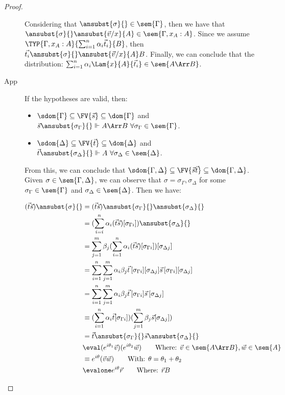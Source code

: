\begin{proof}
\begin{description}
    Considering that $\ansubst{\sigma}{}\in\sem{\Gamma}$, then we have that $\ansubst{\sigma}{}\ansubst{\vec v/x}{A}\in\sem{\Gamma,x_A:A}$. Since we assume $\TYP{\Gamma, x_A:A}{\sum_{i=1}^{n}\alpha_i\vec t_i}{B}$, then $\vec{t_i}\ansubst{\sigma}{}\ansubst{\vec v/x}{A}\real B$. Finally, we can conclude that the distribution: $\sum_{i=1}^{n}\alpha_i \Lam{x}{A}{\vec t_i}\in\sem{A\Arr B}$.

    \item[App] If the hypotheses are valid, then:
    \begin{itemize}
        \item $\sdom{\Gamma}\subseteq \FV{\vec s}\subseteq \dom{\Gamma}$ and $\vec s \ansubst{\sigma_\Gamma}{}\Vdash A\Arr B\ \forall \sigma_\Gamma\in\sem{\Gamma}$.
        \item $\sdom{\Delta}\subseteq \FV{\vec t}\subseteq \dom{\Delta}$ and $\vec t\ansubst{\sigma_\Delta}{}\Vdash A\ \forall\sigma_\Delta\in\sem{\Delta}$.
    \end{itemize}
    
    From this, we can conclude that $\sdom{\Gamma,\Delta}\subseteq \FV{\vec s \vec t}\subseteq \dom{\Gamma,\Delta}$. Given $\sigma\in\sem{\Gamma,\Delta}$, we can observe that $\sigma=\sigma_\Gamma,\sigma_\Delta$ for some $\sigma_\Gamma\in\sem{\Gamma}$ and $\sigma_\Delta\in\sem{\Delta}$. Then we have:
    
    \begin{align*}
        (\vec{t}\vec{s})\ansubst{\sigma}{} &= (\vec{t}\vec{s})\ansubst{\sigma_\Gamma}{}\ansubst{\sigma_\Delta}{}\\
        &=(\sum_{i=i}^{n}\alpha_i (\vec{t}\vec{s})[\sigma_{\Gamma i}])\ansubst{\sigma_\Delta}{}\\
        &=\sum_{j=1}^{m} \beta_j (\sum_{i=1}^{n} \alpha_i (\vec{t} \vec{s})[\sigma_{\Gamma i}])[\sigma_{\Delta j}]\\
        &=\sum_{i=1}^{n}\sum_{j=1}^{m} \alpha_i \beta_j \vec{t}\,[\sigma_{\Gamma i}][\sigma_{\Delta j}] \vec{s}\,[\sigma_{\Gamma i}][\sigma_{\Delta j}]\\
        &=\sum_{i=1}^{n}\sum_{j=1}^{m} \alpha_i \beta_j \vec{t}\,[\sigma_{\Gamma i}]\vec{s}\,[\sigma_{\Delta j}]\\
        &\equiv (\sum_{i=1}^{n}\alpha_i\vec{t}[\sigma_{\Gamma i}])(\sum_{j=1}^{m} \beta_j \vec{s}[\sigma_{\Delta j}])\\
        &=\vec{t}\ansubst{\sigma_\Gamma}{} \vec{s}\ansubst{\sigma_\Delta}{}\\
        &\eval (e^{i\theta_{1}} \vec{v}) (e^{i\theta_{2}} \vec{w})\qquad\text{Where: } \vec{v}\in\sem{A\Arr B}, \vec{w}\in\sem{A}\\
        &\equiv e^{i\theta} (\vec{v} \vec{w})\qquad\text{With: }\theta=\theta_1 + \theta_2\\
        &\evalone e^{i\theta}\vec r\qquad\text{Where: } \vec{r}\real B
    \end{align*}
    

\end{description}
\end{proof}
